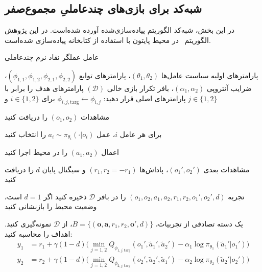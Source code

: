 \subsection{شبه‌کد  برای بازی‌های چندعاملیِ مجموع­‌صفر}

در این بخش، شبه‌کد الگوریتم  پیاده‌سازی‌شده آورده شده‌است. در این پژوهش الگوریتم~ در محیط پایتون با استفاده از کتابخانه  \cite{paszke2017automatic} پیاده‌سازی شده‌است.

\begin{algorithm}[H]
    \caption{عامل عملگر نقاد نرم چند­عاملی}\label{alg:MA-SAC}
    \begin{algorithmic}[1]
         پارامترهای اولیه سیاست عامل‌ها $(\theta_1, \theta_2)$، پارامترهای توابع  $(\phi_{1,1}, \phi_{1,2}, \phi_{2,1}, \phi_{2,2})$، ضرایب آنتروپی $(\alpha_1, \alpha_2)$، بافر تکرار بازی خالی $(\mathcal{D})$
        \State پارامترهای هدف را برابر با پارامترهای اصلی قرار دهید: 
        \Statex \hspace{\algorithmicindent}
        $\phi_{i,j,\text{targ}} \leftarrow \phi_{i,j}$ برای $i \in \{1, 2\}$ و $j \in \{1, 2\}$
        
            \State \parbox[t]{\dimexpr\linewidth-\algorithmicindent}{
            مشاهدات $(o_1, o_2)$ را دریافت کنید
            \strut}
            \State \parbox[t]{\dimexpr\linewidth-\algorithmicindent}{
            برای هر عامل $i$، عمل $a_i \sim \pi_{\theta_i}(\cdot|o_i)$ را انتخاب کنید
            \strut}
            \State اعمال $(a_1, a_2)$ را در محیط اجرا کنید
            \State \parbox[t]{\dimexpr\linewidth-\algorithmicindent}{
            مشاهدات بعدی $(o_1', o_2')$، پاداش‌ها $(r_1, r_2=-r_1)$ و سیگنال پایان $d$ را دریافت کنید
            \strut}
            \State تجربه $(o_1, o_2, a_1, a_2, r_1, r_2, o_1', o_2', d)$ را در بافر $\mathcal{D}$ ذخیره کنید
            \State اگر $d=1$ است، وضعیت محیط را بازنشانی کنید
            
                    \State %
                    یک دسته تصادفی از تجربیات، $B = \{(\boldsymbol{o}, \boldsymbol{a}, r_1, r_2, \boldsymbol{o}', d)\}$، از $\mathcal{D}$ نمونه‌گیری کنید.
                    \State اهداف را محاسبه کنید:
                     \vspace{-15pt}
                    \begin{align*}
                        y_1 &= r_1 + \gamma (1-d) \Big(\min_{j=1,2} Q_{\phi_{1,j,\text{targ}}}(o_1', \tilde{a}_1', \tilde{a}_2') - \alpha_1 \log \pi_{\theta_1}(\tilde{a}_1'|o_1') \Big) \\
                        y_2 &= r_2 + \gamma (1-d) \Big(\min_{j=1,2} Q_{\phi_{2,j,\text{targ}}}(o_2', \tilde{a}_2', \tilde{a}_1') - \alpha_2 \log \pi_{\theta_2}(\tilde{a}_2'|o_2') \Big)
                    \end{align*}
                    \vspace{-35pt}
                    

\end{algorithmic}
\end{algorithm}
